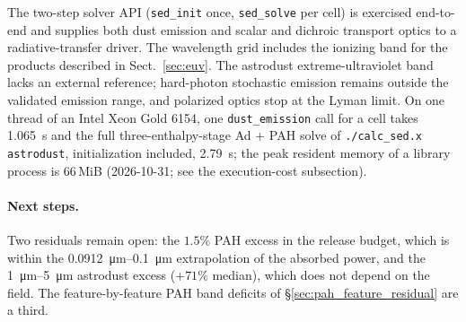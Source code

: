 \documentclass{my_memo}
\begin{document}
The two-step solver API (\texttt{sed\_init} once,
\texttt{sed\_solve} per cell) is exercised end-to-end and supplies both dust emission and scalar
and dichroic transport optics to a radiative-transfer driver. The
wavelength grid includes the ionizing band for the products described
in Sect.~\ref{sec:euv}. The astrodust extreme-ultraviolet band lacks
an external reference; hard-photon stochastic emission remains outside
the validated emission range, and polarized optics stop at the Lyman
limit. On one thread of an Intel Xeon Gold 6154, one
\texttt{dust\_emission} call for a cell takes 1.065~s and the full
three-enthalpy-stage Ad + PAH solve of \texttt{./calc\_sed.x
astrodust}, initialization included, 2.79~s; the peak resident
memory of a library process is 66\,MiB (2026-10-31; see the
execution-cost subsection).

\paragraph{Next steps.} Two residuals remain open: the $1.5\%$ PAH
excess in the release budget, which is within the
\SIrange{0.0912}{0.1}{\micro\meter} extrapolation of the absorbed power,
and the \SIrange{1}{5}{\micro\meter} astrodust excess ($+71\%$ median),
which does not depend on the field. The feature-by-feature PAH band
deficits of \S\ref{sec:pah_feature_residual} are a third.
\end{document}
